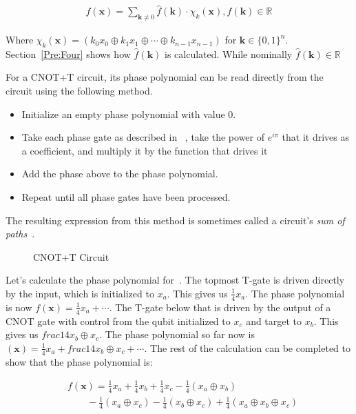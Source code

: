 \begin{equation}
  \begin{aligned}
    \label{eq-boolean-fourier}
    f(\mathbf{x}) = \sum_{\mathbf{k} \neq 0} \hat{f}(\mathbf{k}) \cdot \chi_k(\mathbf{x}),
    \hat{f}(\mathbf{k}) \in \mathbb{R}
  \end{aligned}
\end{equation}

Where $\chi_k(\mathbf{x}) = ( k_0 x_0 \oplus k_1 x_1 \oplus \cdots \oplus k_{n-1} x_{n-1})$
for $\mathbf{k} \in \{0,1\}^{n}$. Section~\ref{Pre:Four} shows how $\hat{f}(\mathbf{k})$ is
calculated. While nominally $\hat{f}(\mathbf{k}) \in \mathbb{R}$

For a CNOT+T circuit, its phase polynomial can be read directly from the circuit using the
following method.

\begin{itemize}
\item Initialize an empty phase polynomial with value 0.
\item Take each phase gate as described in ~, take the power
  of $e^{i\pi}$ that it drives as a coefficient, and multiply it by the function
  that drives it
\item Add the phase above to the phase polynomial.
\item Repeat until all phase gates have been processed.
\end{itemize}

The resulting expression from this method is sometimes called a circuit's \emph{sum of paths}~\cite{bib-amy-cnot}.
\begin{figure}[t]
  \centering
  \scalebox{0.7} {
    
  }
  \caption{CNOT+T Circuit}
  \label{fig-toff-mark-matroid2}
\end{figure}

\begin{example}
  Let's calculate the phase polynomial for~. The topmost T-gate
  is driven directly by the input, which is initialized to $x_a$. This gives us $\frac{1}{4} x_a$.
  The phase polynomial is now $f(\mathbf{x}) = \frac{1}{4} x_a + \cdots$. The T-gate below
  that is driven by the output of a CNOT gate with control from the qubit initialized to $x_c$
  and target to $x_b$. This gives us $frac{1}{4} x_b \oplus x_c$. The phase polynomial so far
  now is $(\mathbf{x}) = \frac{1}{4} x_a + frac{1}{4} x_b \oplus x_c + \cdots$. The rest of the
  calculation can be completed to show that the phase polynomial is:

\begin{equation}
  \label{eq-pp-ex}
  \begin{aligned}
    &f(\mathbf{x}) = \frac{1}{4}x_a + \frac{1}{4}x_b + \frac{1}{4}x_c - \frac{1}{4}(x_a \oplus x_b) \\
    &\qquad -\frac{1}{4}(x_a \oplus x_c) - \frac{1}{4}(x_b \oplus x_c) + \frac{1}{4}(x_a \oplus x_b \oplus x_c)\nonumber
  \end{aligned}
\end{equation}

\end{example}



